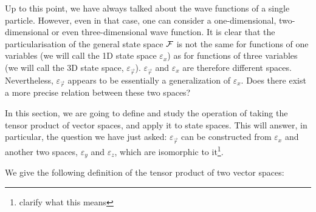 Up to this point, we have always talked about the wave functions of a single particle. However, even in that case, one can consider a one-dimensional, two-dimensional or even three-dimensional wave function. It is clear that the particularisation of the general state space $\mathcal{F}$ is not the same for functions of one variables (we will call the 1D state space $\varepsilon_x$) as for functions of three variables (we will call the 3D state space, $\varepsilon_{\vec{r}}$). $\varepsilon_{\vec{r}}$ and $\varepsilon_x$ are therefore different spaces. Nevertheless, $\varepsilon_{\vec{r}}$ appears to be essentially a generalization of $\varepsilon_x$. Does there exist a more precise relation between these two spaces?

In this section, we are going to define and study the operation of taking the tensor product of vector spaces, and apply it to state spaces. This will answer, in particular, the question we have just asked: $\varepsilon_{\vec{r}}$ can be constructed from $\varepsilon_x$ and another two spaces, $\varepsilon_y$ and $\varepsilon_z$, which are isomorphic to it\footnote{\color{red}clarify what this means}. 

We give the following definition of the tensor product of two vector spaces:

